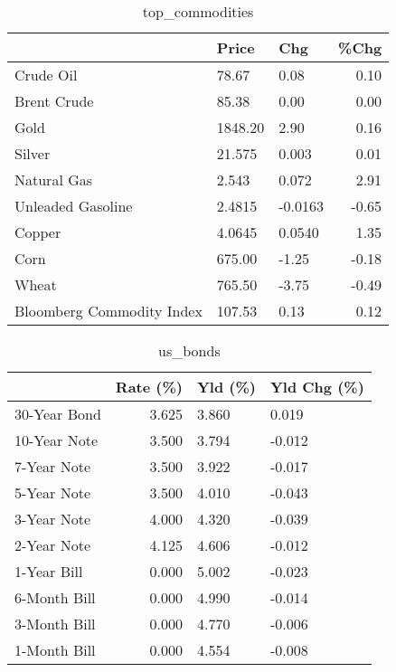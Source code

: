 \documentclass{article}%
\begin{document}
\begin{table}[htbp]%
\caption{top\_commodities}%
\centering%
\begin{adjustbox}{width=1\textwidth}%
\begin{tabular}{lllr}
\toprule
                          &   Price &     Chg &  \%Chg \\
\midrule
               Crude Oil  &   78.67 &    0.08 &  0.10 \\
             Brent Crude  &   85.38 &    0.00 &  0.00 \\
                    Gold  & 1848.20 &    2.90 &  0.16 \\
                  Silver  &  21.575 &   0.003 &  0.01 \\
             Natural Gas  &   2.543 &   0.072 &  2.91 \\
       Unleaded Gasoline  &  2.4815 & -0.0163 & -0.65 \\
                  Copper  &  4.0645 &  0.0540 &  1.35 \\
                    Corn  &  675.00 &   -1.25 & -0.18 \\
                   Wheat  &  765.50 &   -3.75 & -0.49 \\
Bloomberg Commodity Index &  107.53 &    0.13 &  0.12 \\
\bottomrule
\end{tabular}
%
\end{adjustbox}%
\end{table}

%


\begin{table}[htbp]%
\caption{us\_bonds}%
\centering%
\begin{adjustbox}{width=1\textwidth}%
\begin{tabular}{lrll}
\toprule
             &  Rate (\%) & Yld (\%) & Yld Chg (\%) \\
\midrule
30-Year Bond &     3.625 &   3.860 &       0.019 \\
10-Year Note &     3.500 &   3.794 &      -0.012 \\
 7-Year Note &     3.500 &   3.922 &      -0.017 \\
 5-Year Note &     3.500 &   4.010 &      -0.043 \\
 3-Year Note &     4.000 &   4.320 &      -0.039 \\
 2-Year Note &     4.125 &   4.606 &      -0.012 \\
 1-Year Bill &     0.000 &   5.002 &      -0.023 \\
6-Month Bill &     0.000 &   4.990 &      -0.014 \\
3-Month Bill &     0.000 &   4.770 &      -0.006 \\
1-Month Bill &     0.000 &   4.554 &      -0.008 \\
\bottomrule
\end{tabular}
%
\end{adjustbox}%
\end{table}
\end{document}
